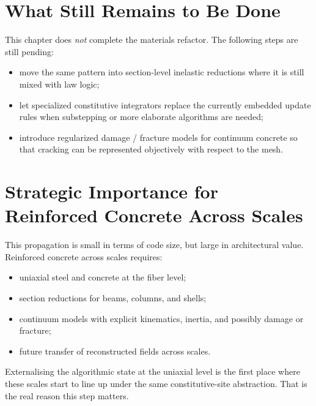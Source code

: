 \section{What Still Remains to Be Done}

This chapter does \emph{not} complete the materials refactor.  The following
steps are still pending:

\begin{itemize}
  \item move the same pattern into section-level inelastic reductions where it
        is still mixed with law logic;
  \item let specialized constitutive integrators replace the currently embedded
        update rules when substepping or more elaborate algorithms are needed;
  \item introduce regularized damage / fracture models for continuum concrete
        so that cracking can be represented objectively with respect to the
        mesh.
\end{itemize}

\section{Strategic Importance for Reinforced Concrete Across Scales}

This propagation is small in terms of code size, but large in architectural
value.  Reinforced concrete across scales requires:

\begin{itemize}
  \item uniaxial steel and concrete at the fiber level;
  \item section reductions for beams, columns, and shells;
  \item continuum models with explicit kinematics, inertia, and possibly
        damage or fracture;
  \item future transfer of reconstructed fields across scales.
\end{itemize}

Externalising the algorithmic state at the uniaxial level is the first place
where these scales start to line up under the same constitutive-site
abstraction.  That is the real reason this step matters.
